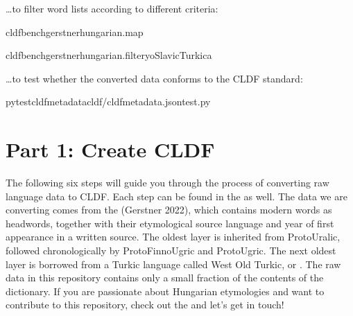 \documentclass[letterpaper,10pt,english]{sphinxmanual}
\begin{document}
\sphinxAtStartPar
…to filter word lists according to different criteria:

\begin{sphinxVerbatim}[commandchars=\\\{\}]
cldfbenchgerstnerhungarian.map

cldfbenchgerstnerhungarian.filter\PYGZhy{}y\PYGZhy{}oSlavicTurkic\PYGZhy{}a
\end{sphinxVerbatim}

\sphinxAtStartPar
…to test whether the converted data conforms to the CLDF standard:

\begin{sphinxVerbatim}[commandchars=\\\{\}]
pytest\PYGZhy{}\PYGZhy{}cldf\PYGZhy{}metadatacldf/cldf\PYGZhy{}metadata.jsontest.py
\end{sphinxVerbatim}

\sphinxstepscope


\chapter{Part 1: Create CLDF}
\label{\detokenize{mkcldf:part-1-create-cldf}}\label{\detokenize{mkcldf::doc}}
\sphinxAtStartPar
The following six steps will guide you through the process of
converting raw language data to CLDF. Each step can be found in the
as well. The data we are converting comes from
the  (Gerstner 2022),
which contains modern  words as headwords,
together with their
etymological source language and year of first appearance in a written source.
The oldest layer is inherited from Proto\sphinxhyphen{}Uralic, followed chronologically by
Proto\sphinxhyphen{}Finno\sphinxhyphen{}Ugric and
Proto\sphinxhyphen{}Ugric. The next oldest layer is borrowed from a Turkic language called
West Old Turkic, or . The raw data in this
repository contains
only a small fraction of the contents of the dictionary.
If you are passionate about Hungarian etymologies and want to contribute
to this repository, check out the 
and let’s get in touch!
\end{document}
